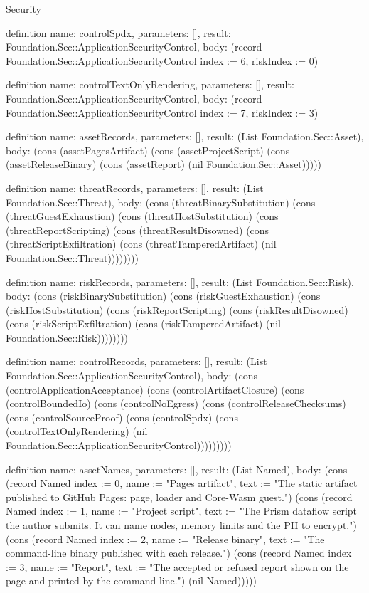 \begin{lexlean}{Security}
\begin{semanticmodule}
definition{
  name: controlSpdx,
  parameters: [],
  result: Foundation.Sec::ApplicationSecurityControl,
  body: (record Foundation.Sec::ApplicationSecurityControl {index := 6, riskIndex := 0})
}

definition{
  name: controlTextOnlyRendering,
  parameters: [],
  result: Foundation.Sec::ApplicationSecurityControl,
  body: (record Foundation.Sec::ApplicationSecurityControl {index := 7, riskIndex := 3})
}

definition{
  name: assetRecords,
  parameters: [],
  result: (List Foundation.Sec::Asset),
  body: (cons (assetPagesArtifact) (cons (assetProjectScript) (cons (assetReleaseBinary) (cons (assetReport) (nil Foundation.Sec::Asset)))))
}

definition{
  name: threatRecords,
  parameters: [],
  result: (List Foundation.Sec::Threat),
  body: (cons (threatBinarySubstitution) (cons (threatGuestExhaustion) (cons (threatHostSubstitution) (cons (threatReportScripting) (cons (threatResultDisowned) (cons (threatScriptExfiltration) (cons (threatTamperedArtifact) (nil Foundation.Sec::Threat))))))))
}

definition{
  name: riskRecords,
  parameters: [],
  result: (List Foundation.Sec::Risk),
  body: (cons (riskBinarySubstitution) (cons (riskGuestExhaustion) (cons (riskHostSubstitution) (cons (riskReportScripting) (cons (riskResultDisowned) (cons (riskScriptExfiltration) (cons (riskTamperedArtifact) (nil Foundation.Sec::Risk))))))))
}

definition{
  name: controlRecords,
  parameters: [],
  result: (List Foundation.Sec::ApplicationSecurityControl),
  body: (cons (controlApplicationAcceptance) (cons (controlArtifactClosure) (cons (controlBoundedIo) (cons (controlNoEgress) (cons (controlReleaseChecksums) (cons (controlSourceProof) (cons (controlSpdx) (cons (controlTextOnlyRendering) (nil Foundation.Sec::ApplicationSecurityControl)))))))))
}

definition{
  name: assetNames,
  parameters: [],
  result: (List Named),
  body: (cons (record Named {index := 0, name := "Pages artifact", text := "The static artifact published to GitHub Pages: page, loader and Core-Wasm guest."}) (cons (record Named {index := 1, name := "Project script", text := "The Prism dataflow script the author submits. It can name nodes, memory limits and the PII to encrypt."}) (cons (record Named {index := 2, name := "Release binary", text := "The command-line binary published with each release."}) (cons (record Named {index := 3, name := "Report", text := "The accepted or refused report shown on the page and printed by the command line."}) (nil Named)))))
}


\end{semanticmodule}
\end{lexlean}
